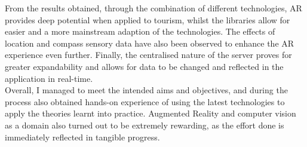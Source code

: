 From the results obtained, through the combination of different technologies, AR provides deep potential when applied to tourism, 
whilst the libraries allow for easier and a more mainstream adaption of the technologies. The effects of location and compass sensory data have 
also been observed to enhance the AR experience even further. Finally, the centralised nature of the server proves for greater expandability and allows 
for data to be changed and reflected in the application in real-time.\\
\noindent
Overall, I managed to meet the intended aims and objectives, and during the process also 
obtained hands-on experience of using the latest technologies to apply the theories learnt into 
practice. Augmented Reality and computer vision as a domain also turned out to be extremely rewarding, as the effort done is immediately reflected in tangible progress. 